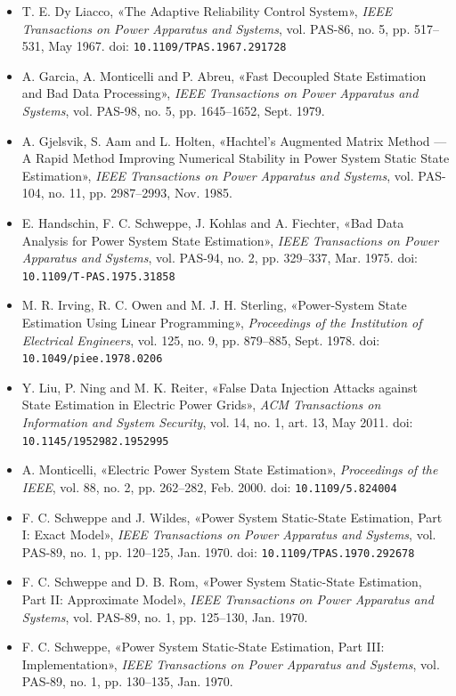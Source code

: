 \begin{itemize}
\item T. E. Dy Liacco, «The Adaptive Reliability Control System», \textit{IEEE Transactions
      on Power Apparatus and Systems}, vol. PAS-86, no. 5, pp. 517--531, May 1967.
      doi: \texttt{10.1109/TPAS.1967.291728}
\item A. Garcia, A. Monticelli and P. Abreu, «Fast Decoupled State Estimation and Bad Data
      Processing», \textit{IEEE Transactions on Power Apparatus and Systems}, vol. PAS-98,
      no. 5, pp. 1645--1652, Sept. 1979.
\item A. Gjelsvik, S. Aam and L. Holten, «Hachtel's Augmented Matrix Method --- A Rapid Method
      Improving Numerical Stability in Power System Static State Estimation», \textit{IEEE
      Transactions on Power Apparatus and Systems}, vol. PAS-104, no. 11, pp. 2987--2993,
      Nov. 1985.
\item E. Handschin, F. C. Schweppe, J. Kohlas and A. Fiechter, «Bad Data Analysis for Power
      System State Estimation», \textit{IEEE Transactions on Power Apparatus and Systems},
      vol. PAS-94, no. 2, pp. 329--337, Mar. 1975. doi: \texttt{10.1109/T-PAS.1975.31858}
\item M. R. Irving, R. C. Owen and M. J. H. Sterling, «Power-System State Estimation Using
      Linear Programming», \textit{Proceedings of the Institution of Electrical Engineers},
      vol. 125, no. 9, pp. 879--885, Sept. 1978. doi: \texttt{10.1049/piee.1978.0206}
\item Y. Liu, P. Ning and M. K. Reiter, «False Data Injection Attacks against State
      Estimation in Electric Power Grids», \textit{ACM Transactions on Information and System
      Security}, vol. 14, no. 1, art. 13, May 2011.
      doi: \texttt{10.1145/1952982.1952995}
\item A. Monticelli, «Electric Power System State Estimation», \textit{Proceedings of the
      IEEE}, vol. 88, no. 2, pp. 262--282, Feb. 2000.
      doi: \texttt{10.1109/5.824004}
\item F. C. Schweppe and J. Wildes, «Power System Static-State Estimation, Part I: Exact
      Model», \textit{IEEE Transactions on Power Apparatus and Systems}, vol. PAS-89, no. 1,
      pp. 120--125, Jan. 1970. doi: \texttt{10.1109/TPAS.1970.292678}
\item F. C. Schweppe and D. B. Rom, «Power System Static-State Estimation, Part II:
      Approximate Model», \textit{IEEE Transactions on Power Apparatus and Systems},
      vol. PAS-89, no. 1, pp. 125--130, Jan. 1970.
\item F. C. Schweppe, «Power System Static-State Estimation, Part III: Implementation»,
      \textit{IEEE Transactions on Power Apparatus and Systems}, vol. PAS-89, no. 1,
      pp. 130--135, Jan. 1970.
\end{itemize}

